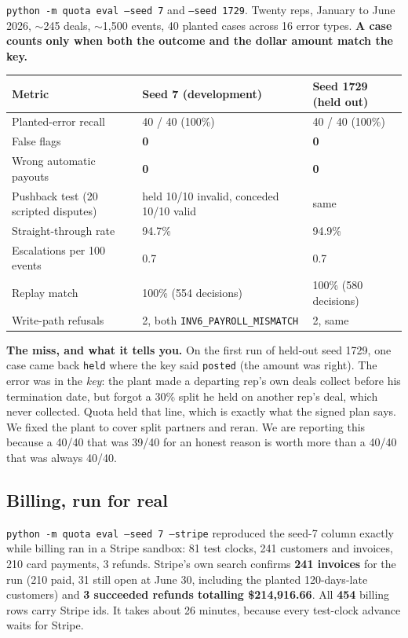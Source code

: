 \documentclass[10pt,a4paper]{article}
\newcommand{\gy}[1]{{\color{qgrey}#1}}
\newcommand{\code}[1]{{\small\texttt{#1}}}
\begin{document}
\code{python -m quota eval --seed 7} and \code{--seed 1729}. Twenty reps, January to June 2026, $\sim$245 deals, $\sim$1{,}500 events, 40 planted cases across 16 error types. \textbf{A case counts only when both the outcome and the dollar amount match the key.}

\begin{tabularx}{\textwidth}{@{}Xp{30mm}p{32mm}@{}}
\toprule
\textbf{Metric} & \textbf{Seed 7} \gy{(development)} & \textbf{Seed 1729} \gy{(held out)}\\
\midrule
Planted-error recall & 40 / 40 \gy{(100\%)} & 40 / 40 \gy{(100\%)}\\
False flags & \textbf{0} & \textbf{0}\\
Wrong automatic payouts & \textbf{0} & \textbf{0}\\
Pushback test \gy{(20 scripted disputes)} & held 10/10 invalid, conceded 10/10 valid & same\\
Straight-through rate & 94.7\% & 94.9\%\\
Escalations per 100 events & 0.7 & 0.7\\
Replay match & 100\% \gy{(554 decisions)} & 100\% \gy{(580 decisions)}\\
Write-path refusals & 2, both \code{INV6\_PAYROLL\_MISMATCH} & 2, same\\
\bottomrule
\end{tabularx}

\vspace{4pt}
\textbf{The miss, and what it tells you.} On the first run of held-out seed 1729, one case came back \code{held} where the key said \code{posted} \gy{(the amount was right)}. The error was in the \emph{key}: the plant made a departing rep's own deals collect before his termination date, but forgot a 30\% split he held on another rep's deal, which never collected. Quota held that line, which is exactly what the signed plan says. We fixed the plant to cover split partners and reran. We are reporting this because a 40/40 that was 39/40 for an honest reason is worth more than a 40/40 that was always 40/40.

\subsection{Billing, run for real}

\code{python -m quota eval --seed 7 --stripe} reproduced the seed-7 column exactly while billing ran in a Stripe sandbox: 81 test clocks, 241 customers and invoices, 210 card payments, 3 refunds. Stripe's own search confirms \textbf{241 invoices} for the run \gy{(210 paid, 31 still open at June 30, including the planted 120-days-late customers)} and \textbf{3 succeeded refunds totalling \$214{,}916.66}. All \textbf{454} billing rows carry Stripe ids. It takes about 26 minutes, because every test-clock advance waits for Stripe.
\end{document}
